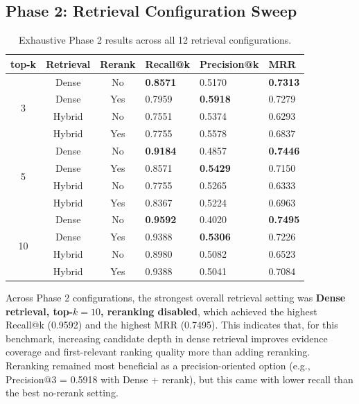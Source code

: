 \documentclass[a4paper,12pt]{article}
\begin{document}
\subsection{Phase 2: Retrieval Configuration Sweep}

\begin{table}[htbp]
\centering
\caption{Exhaustive Phase 2 results across all 12 retrieval configurations.}
\small
\setlength{\tabcolsep}{5pt}
\begin{tabular}{ccclll}
\toprule
top-k & Retrieval & Rerank & Recall@k & Precision@k & MRR \\
\midrule
\multirow{4}{*}{3}  & Dense  & No  & \textbf{0.8571} & 0.5170 & \textbf{0.7313} \\
                    & Dense  & Yes & 0.7959 & \textbf{0.5918} & 0.7279 \\
                    & Hybrid & No  & 0.7551 & 0.5374 & 0.6293 \\
                    & Hybrid & Yes & 0.7755 & 0.5578 & 0.6837 \\
\midrule
\multirow{4}{*}{5}  & Dense  & No  & \textbf{0.9184} & 0.4857 & \textbf{0.7446} \\
                    & Dense  & Yes & 0.8571 & \textbf{0.5429} & 0.7150 \\
                    & Hybrid & No  & 0.7755 & 0.5265 & 0.6333 \\
                    & Hybrid & Yes & 0.8367 & 0.5224 & 0.6963 \\
\midrule
\multirow{4}{*}{10} & Dense  & No  & \textbf{0.9592} & 0.4020 & \textbf{0.7495} \\
                    & Dense  & Yes & 0.9388 & \textbf{0.5306} & 0.7226 \\
                    & Hybrid & No  & 0.8980 & 0.5082 & 0.6523 \\
                    & Hybrid & Yes & 0.9388 & 0.5041 & 0.7084 \\
\bottomrule
\end{tabular}
\end{table}

Across Phase 2 configurations, the strongest overall retrieval setting was \textbf{Dense retrieval, top-$k=10$, reranking disabled}, which achieved the highest Recall@k (0.9592) and the highest MRR (0.7495). This indicates that, for this benchmark, increasing candidate depth in dense retrieval improves evidence coverage and first-relevant ranking quality more than adding reranking. Reranking remained most beneficial as a precision-oriented option (e.g., Precision@3 = 0.5918 with Dense + rerank), but this came with lower recall than the best no-rerank setting.
\end{document}
